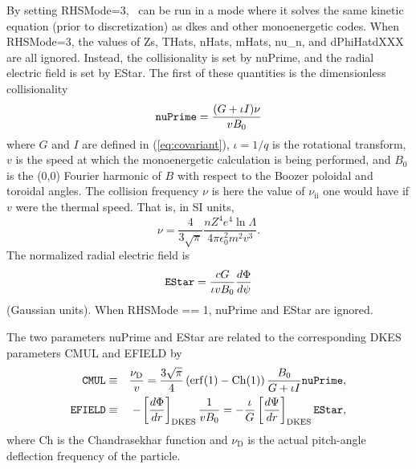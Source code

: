 By setting {\ttfamily RHSMode=3}, \sfincs~can be run in a mode
where it solves the same kinetic equation (prior to discretization) as {\ttfamily dkes}
and other monoenergetic codes.
When {\ttfamily RHSMode=3}, the values of {\ttfamily Zs}, {\ttfamily THats}, {\ttfamily nHats},
{\ttfamily mHats}, {\ttfamily nu\_n}, and {\ttfamily dPhiHatdXXX} are all ignored.
Instead, the collisionality is set by {\ttfamily nuPrime}, and the radial electric field is set
by {\ttfamily EStar}.  The first of these quantities is the dimensionless collisionality
\begin{equation}
\mbox{\ttfamily nuPrime} = \frac{(G+\iota I) \nu}{v B_0}
\end{equation}
where $G$ and $I$ are defined in (\ref{eq:covariant}), $\iota=1/q$ is the rotational transform,
$v$ is the speed at which the monoenergetic calculation is being performed, and $B_0$ is the (0,0) Fourier harmonic of $B$
with respect to the Boozer poloidal and toroidal angles. The collision
frequency $\nu$ is here the value of $\nu_\mathrm{ii}$ one would have if
$v$ were the thermal speed. That is, in SI units,
\begin{equation}
  \nu=\frac{4}{3\sqrt{\pi}}\frac{n Z^4e^4\ln \Lambda}{4\pi\epsilon_0^2m^2v^3}.
\end{equation}
%
The normalized radial electric field is
\begin{equation}
\mbox{\ttfamily EStar} = \frac{cG}{\iota v B_0} \frac{d\Phi}{d\psi}
\end{equation}
(Gaussian units).
When {\ttfamily RHSMode} == 1, {\ttfamily nuPrime} and {\ttfamily EStar} are ignored.

The two parameters {\ttfamily nuPrime} and {\ttfamily EStar} are
related to the corresponding DKES parameters {\ttfamily CMUL} and
{\ttfamily EFIELD} by
\begin{eqnarray}
  \mbox{\ttfamily
    CMUL}&\equiv&\frac{\nu_\mathrm{D}}{v}=\frac{3\sqrt{\pi}}{4}\left(\mathrm{erf}(1)-\mathrm{Ch}(1)\right)
  \frac{B_0}{G+\iota I}\mbox{\ttfamily nuPrime},\\
  \mbox{\ttfamily EFIELD}&\equiv&-\left[\frac{d\Phi}{dr}\right]_\mathrm{DKES}\frac{1}{vB_0}=-\frac{\iota}{G}\left[\frac{d\Psi}{dr}\right]_\mathrm{DKES}\mbox{\ttfamily EStar},
\end{eqnarray}
where $\mathrm{Ch}$ is the Chandrasekhar function and $\nu_\mathrm{D}$
is the actual pitch-angle deflection frequency of the particle.
